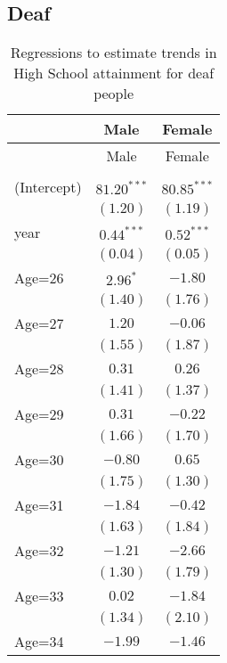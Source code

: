 \documentclass[fullpage]{paper}
\begin{document}
\subsection{ Deaf }

\begin{center}
\begin{longtable}{l c c }
\hline
 & Male & Female \\
\hline
\endfirsthead
\hline
 & Male & Female \\
\hline
\endhead
\hline
\endfoot
\hline
\multicolumn{3}{l}{\scriptsize{$^{***}p<0.001$, $^{**}p<0.01$, $^*p<0.05$}}\\
\caption{Regressions to estimate trends in High School attainment for deaf people}
\label{table:coefficients}
\endlastfoot
(Intercept) & $81.20^{***}$ & $80.85^{***}$ \\
            & $(1.20)$      & $(1.19)$      \\
year        & $0.44^{***}$  & $0.52^{***}$  \\
            & $(0.04)$      & $(0.05)$      \\
Age=26      & $2.96^{*}$    & $-1.80$       \\
            & $(1.40)$      & $(1.76)$      \\
Age=27      & $1.20$        & $-0.06$       \\
            & $(1.55)$      & $(1.87)$      \\
Age=28      & $0.31$        & $0.26$        \\
            & $(1.41)$      & $(1.37)$      \\
Age=29      & $0.31$        & $-0.22$       \\
            & $(1.66)$      & $(1.70)$      \\
Age=30      & $-0.80$       & $0.65$        \\
            & $(1.75)$      & $(1.30)$      \\
Age=31      & $-1.84$       & $-0.42$       \\
            & $(1.63)$      & $(1.84)$      \\
Age=32      & $-1.21$       & $-2.66$       \\
            & $(1.30)$      & $(1.79)$      \\
Age=33      & $0.02$        & $-1.84$       \\
            & $(1.34)$      & $(2.10)$      \\
Age=34      & $-1.99$       & $-1.46$       \\

\end{longtable}
\end{center}
\end{document}
